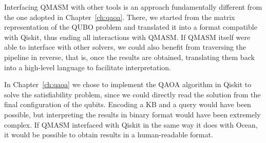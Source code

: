 Interfacing QMASM with other tools is an approach fundamentally different from the one adopted in Chapter~\ref{ch:qaoa}. There, we started from the matrix representation of the QUBO problem and translated it into a format compatible with Qiskit, thus ending all interactions with QMASM. If QMASM itself were able to interface with other solvers, we could also benefit from traversing the pipeline in reverse, that is, once the results are obtained, translating them back into a high-level language to facilitate interpretation.

In Chapter~\ref{ch:qaoa} we chose to implement the QAOA algorithm in Qiskit to solve the satisfiability problem, since we could directly read the solution from the final configuration of the qubits. Encoding a KB and a query would have been possible, but interpreting the results in binary format would have been extremely complex. If QMASM interfaced with Qiskit in the same way it does with Ocean, it would be possible to obtain results in a human-readable format.
